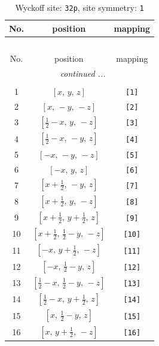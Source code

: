 \documentclass[fleqn,8pt]{jsarticle}
\begin{document}
\renewcommand{\arraystretch}{1.2}
\begin{longtable}{ccc}
\caption{Wyckoff site: {\tt 32p}, site symmetry: {\tt 1}}
 \\
 \hline \hline
No. & position & mapping \\ \hline \endfirsthead

\multicolumn{2}{l}{\tablename\ \thetable{}} \\
 \hline \hline
No. & position & mapping \\ \hline \endhead

 \hline \hline
\multicolumn{2}{r}{\footnotesize\it continued ...} \\ \endfoot

 \hline \hline
\multicolumn{2}{r}{} \\ \endlastfoot

1 & $\left[ x,\, y,\, z \right]$ & {\tt [1]} \\ \hline
2 & $\left[ x,\, - y,\, - z \right]$ & {\tt [2]} \\ \hline
3 & $\left[ \frac{1}{2} - x,\, y,\, - z \right]$ & {\tt [3]} \\ \hline
4 & $\left[ \frac{1}{2} - x,\, - y,\, z \right]$ & {\tt [4]} \\ \hline
5 & $\left[ - x,\, - y,\, - z \right]$ & {\tt [5]} \\ \hline
6 & $\left[ - x,\, y,\, z \right]$ & {\tt [6]} \\ \hline
7 & $\left[ x + \frac{1}{2},\, - y,\, z \right]$ & {\tt [7]} \\ \hline
8 & $\left[ x + \frac{1}{2},\, y,\, - z \right]$ & {\tt [8]} \\ \hline
9 & $\left[ x + \frac{1}{2},\, y + \frac{1}{2},\, z \right]$ & {\tt [9]} \\ \hline
10 & $\left[ x + \frac{1}{2},\, \frac{1}{2} - y,\, - z \right]$ & {\tt [10]} \\ \hline
11 & $\left[ - x,\, y + \frac{1}{2},\, - z \right]$ & {\tt [11]} \\ \hline
12 & $\left[ - x,\, \frac{1}{2} - y,\, z \right]$ & {\tt [12]} \\ \hline
13 & $\left[ \frac{1}{2} - x,\, \frac{1}{2} - y,\, - z \right]$ & {\tt [13]} \\ \hline
14 & $\left[ \frac{1}{2} - x,\, y + \frac{1}{2},\, z \right]$ & {\tt [14]} \\ \hline
15 & $\left[ x,\, \frac{1}{2} - y,\, z \right]$ & {\tt [15]} \\ \hline
16 & $\left[ x,\, y + \frac{1}{2},\, - z \right]$ & {\tt [16]} \\ \hline

\end{longtable}
\end{document}
